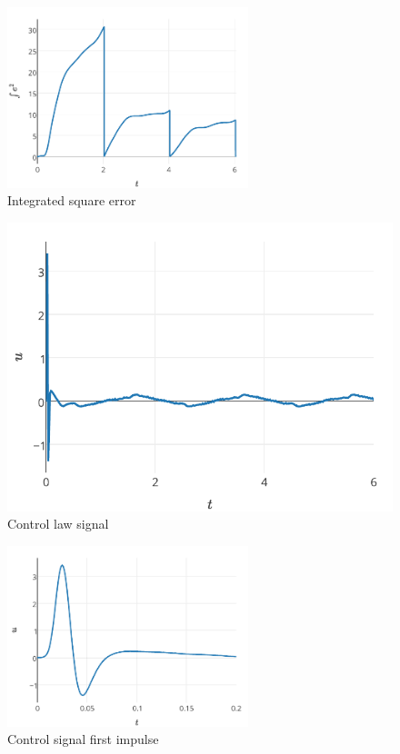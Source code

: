 \documentclass[journal]{IEEEtran}
\begin{document}
\begin{figure}[!t]
    \centering
    \includegraphics[width=7cm]{IEC}
    \caption{Integrated square error}
    \label{fig_iec}
\end{figure}

\begin{figure}[!t]
    \centering
    \includegraphics[width=\textwidth]{control}
    \caption{Control law signal}
    \label{fig_control}
\end{figure}

\begin{figure}[!t]
    \centering
    \includegraphics[width=7cm]{controlimpulse}
    \caption{Control signal first impulse}
    \label{fig_controlimpulse}
\end{figure}
\end{document}
